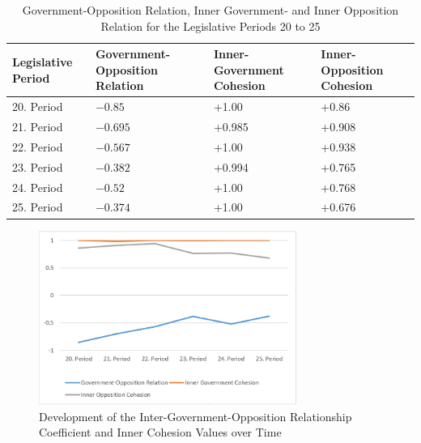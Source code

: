 \begin{table}

\centering
\bgroup
\def\arraystretch{1.2}
\begin{tabular}{| p{2cm} | p{3cm} | p{3cm} | p{3cm} |}
\hline
  Legislative Period & Government-Opposition Relation & Inner-Government Cohesion & Inner-Opposition Cohesion \\
\hline
\hline
  20. Period & $-0.85$ & +1.00 & +0.86 \\
\hline
  21. Period & $-0.695$ & +0.985 & +0.908 \\
\hline
  22. Period & $-0.567$ & +1.00 & +0.938 \\
\hline
  23. Period & $-0.382$ & +0.994 & +0.765\\
\hline
  24. Period & $-0.52$ & +1.00 & +0.768\\
\hline
  25. Period & $-0.374$ & +1.00 & +0.676\\
\hline

\end{tabular}
\egroup
\caption{Government-Opposition Relation, Inner Government- and Inner Opposition Relation for the Legislative Periods 20 to 25}
\label{table:gov_opp_relation}
\end{table}

\begin{figure}
\center
	\includegraphics[width=0.75\textwidth]{imgs/gov_opp_rel_graph}
	\caption{Development of the Inter-Government-Opposition Relationship Coefficient and Inner Cohesion Values over Time}
	\label{fig:gov_opp_relation}
\end{figure}